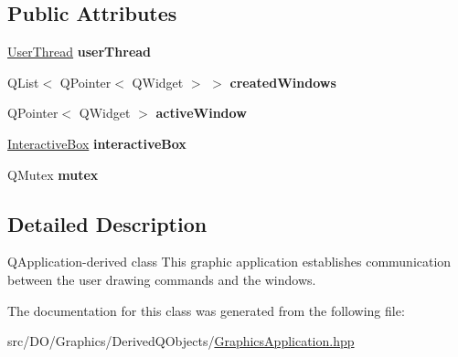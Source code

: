 \subsection*{Public Attributes}
\begin{DoxyCompactItemize}
\item 
\hypertarget{class_d_o_1_1_graphics_application_acd43bf2c420526decde3e16bca3b34d1}{\hyperlink{class_d_o_1_1_user_thread}{User\-Thread} {\bfseries user\-Thread}}\label{class_d_o_1_1_graphics_application_acd43bf2c420526decde3e16bca3b34d1}

\item 
\hypertarget{class_d_o_1_1_graphics_application_ae75bc8ab11de0993ec82b0dd4a26d521}{Q\-List$<$ Q\-Pointer$<$ Q\-Widget $>$ $>$ {\bfseries created\-Windows}}\label{class_d_o_1_1_graphics_application_ae75bc8ab11de0993ec82b0dd4a26d521}

\item 
\hypertarget{class_d_o_1_1_graphics_application_add8fca3b038b4747c6554c0f64cda1dc}{Q\-Pointer$<$ Q\-Widget $>$ {\bfseries active\-Window}}\label{class_d_o_1_1_graphics_application_add8fca3b038b4747c6554c0f64cda1dc}

\item 
\hypertarget{class_d_o_1_1_graphics_application_a5f689b51b1b814abf7df7dbc0f83f49d}{\hyperlink{struct_d_o_1_1_interactive_box}{Interactive\-Box} {\bfseries interactive\-Box}}\label{class_d_o_1_1_graphics_application_a5f689b51b1b814abf7df7dbc0f83f49d}

\item 
\hypertarget{class_d_o_1_1_graphics_application_af6f9da7af5126b3f589fc5ff8b002335}{Q\-Mutex {\bfseries mutex}}\label{class_d_o_1_1_graphics_application_af6f9da7af5126b3f589fc5ff8b002335}

\end{DoxyCompactItemize}


\subsection{Detailed Description}
Q\-Application-\/derived class This graphic application establishes communication between the user drawing commands and the windows. 

The documentation for this class was generated from the following file\-:\begin{DoxyCompactItemize}
\item 
src/\-D\-O/\-Graphics/\-Derived\-Q\-Objects/\hyperlink{_graphics_application_8hpp}{Graphics\-Application.\-hpp}\end{DoxyCompactItemize}
